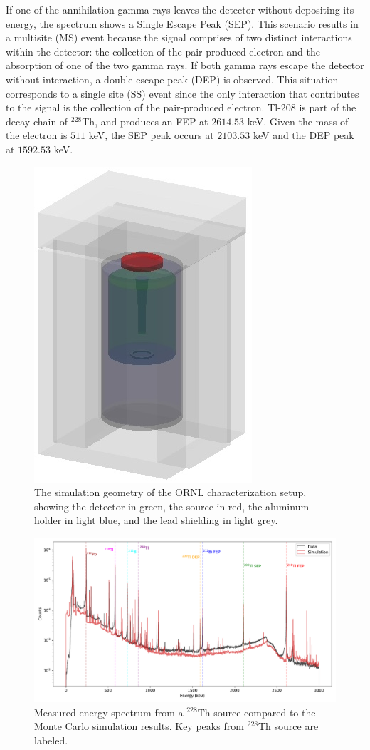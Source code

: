 If one of the annihilation gamma rays leaves the detector without depositing its energy, the spectrum shows a Single Escape Peak (SEP). This scenario results in a multisite (MS) event because the signal comprises of two distinct interactions within the detector: the collection of the pair-produced electron and the absorption of one of the two gamma rays. If both gamma rays escape the detector without interaction, a double escape peak (DEP) is observed. This situation corresponds to a single site (SS) event since the only interaction that contributes to the signal is the collection of the pair-produced electron. Tl-208 is part of the decay chain of $^{228}$Th, and produces an FEP at $2614.53$ keV. Given the mass of the electron is $511$ keV, the SEP peak occurs at $2103.53$ keV and the DEP peak at $1592.53$ keV. 


\begin{figure}%
    \centering
    \includegraphics[width=0.4\linewidth]{ch7/figs/shielding.jpeg}
    \caption{The simulation geometry of the ORNL characterization setup, showing the detector in green, the source in red, the aluminum holder in light blue, and the lead shielding in light grey.}
   \label{fig:g4simple_setup}
\end{figure}


\begin{figure}%
\centering
    \includegraphics[width=0.99\linewidth,trim={0pc 0pc 0pc 0pc},clip]{ch7/figs/energy_spectrum_comparison.pdf}
    \caption{Measured energy spectrum from a $^{228}$Th source compared to the Monte Carlo simulation results. Key peaks from $^{228}$Th source are labeled.}
   \label{fig:eng_spec}
\end{figure}

